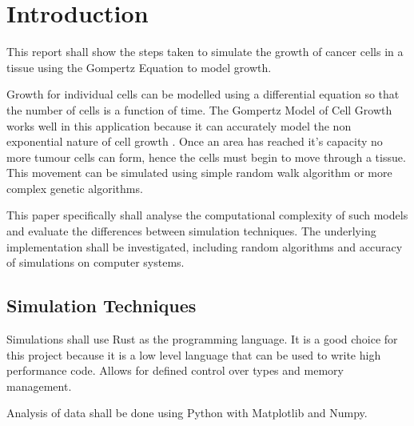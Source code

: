 \chapter{Introduction}

This report shall show the steps taken to simulate the growth of cancer cells in a tissue using the Gompertz Equation to model growth.

Growth for individual cells can be modelled using a differential equation so that the number of cells is a function of time. The Gompertz Model of Cell Growth works well in this application because it can accurately model the non exponential nature of cell growth \autocite{tatroMathematicsCancerFitting}. Once an area has reached it's capacity no more tumour cells can form, hence the cells must begin to move through a tissue. This movement can be simulated using simple random walk algorithm or more complex genetic algorithms.

This paper specifically shall analyse the computational complexity of such models and evaluate the differences between simulation techniques. The underlying implementation shall be investigated, including random algorithms and accuracy of simulations on computer systems.

\section{Simulation Techniques}

Simulations shall use Rust as the programming language. 
It is a good choice for this project because it is a low level language that can be used to write high performance code.
Allows for defined control over types and memory management.

Analysis of data shall be done using Python with Matplotlib and Numpy.